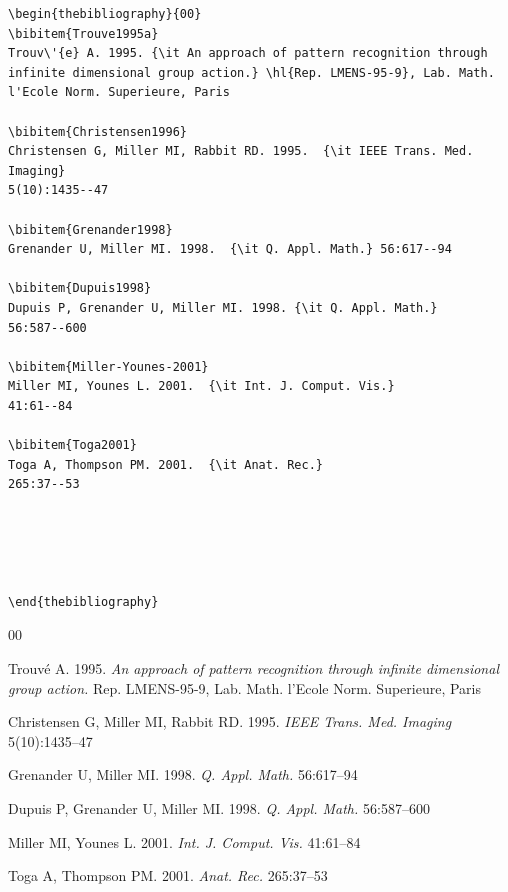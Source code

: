 \documentclass{ar-1col}
\begin{document}
\begin{verbatim}
\begin{thebibliography}{00}
\bibitem{Trouve1995a}
Trouv\'{e} A. 1995. {\it An approach of pattern recognition through
infinite dimensional group action.} \hl{Rep. LMENS-95-9}, Lab. Math. l'Ecole Norm. Superieure, Paris  

\bibitem{Christensen1996}
Christensen G, Miller MI, Rabbit RD. 1995.  {\it IEEE Trans. Med. Imaging}
5(10):1435--47

\bibitem{Grenander1998}
Grenander U, Miller MI. 1998.  {\it Q. Appl. Math.} 56:617--94

\bibitem{Dupuis1998}
Dupuis P, Grenander U, Miller MI. 1998. {\it Q. Appl. Math.}
56:587--600

\bibitem{Miller-Younes-2001}
Miller MI, Younes L. 2001.  {\it Int. J. Comput. Vis.}
41:61--84

\bibitem{Toga2001}
Toga A, Thompson PM. 2001.  {\it Anat. Rec.}
265:37--53





\end{thebibliography}
\end{verbatim}




\begin{thebibliography}{00}

Trouv\'{e} A. 1995. {\it An approach of pattern recognition through
infinite dimensional group action.} Rep. LMENS-95-9, Lab. Math. l'Ecole Norm. Superieure, Paris  

Christensen G, Miller MI, Rabbit RD. 1995.  {\it IEEE Trans. Med. Imaging}
5(10):1435--47

Grenander U, Miller MI. 1998.  {\it Q. Appl. Math.} 56:617--94

Dupuis P, Grenander U, Miller MI. 1998. {\it Q. Appl. Math.}
56:587--600

Miller MI, Younes L. 2001.  {\it Int. J. Comput. Vis.}
41:61--84

Toga A, Thompson PM. 2001.  {\it Anat. Rec.}
265:37--53



 

\end{thebibliography}
\end{document}
